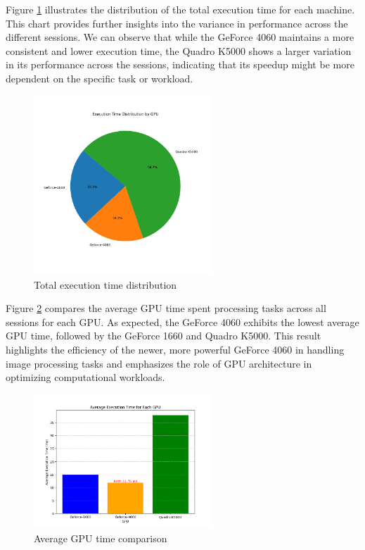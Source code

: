 Figure \ref{figure:execution_time_distribution} illustrates the distribution of the total execution time for each machine. This chart provides further insights into the variance in performance across the different sessions. We can observe that while the GeForce 4060 maintains a more consistent and lower execution time, the Quadro K5000 shows a larger variation in its performance across the sessions, indicating that its speedup might be more dependent on the specific task or workload.
\begin{figure}[H]
    \centering
    \includegraphics[width=0.6\textwidth]{images/execution_time_distribution.jpeg}
    \caption{Total execution time distribution}
    \label{figure:execution_time_distribution}
\end{figure}

Figure \ref{figure:average_gpu_time} compares the average GPU time spent processing tasks across all sessions for each GPU. As expected, the GeForce 4060 exhibits the lowest average GPU time, followed by the GeForce 1660 and Quadro K5000. This result highlights the efficiency of the newer, more powerful GeForce 4060 in handling image processing tasks and emphasizes the role of GPU architecture in optimizing computational workloads.
\begin{figure}[H]
    \centering
    \includegraphics[width=0.6\textwidth]{images/average_gpu_time.jpeg}
    \caption{Average GPU time comparison}
    \label{figure:average_gpu_time}
\end{figure}

